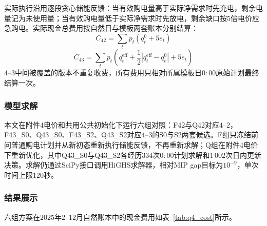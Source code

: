 \documentclass[12pt,a4paper]{ctexart}
\theoremstyle{definition}
\theoremstyle{plain}
\theoremstyle{remark}
\begin{document}
实际执行沿用逐段贪心储能反馈：当有效购电量高于实际净需求时先充电，剩余电量记为未使用量；当有效购电量低于实际净需求时先放电，剩余缺口按$5$倍电价应急购电。实际现金总费用按自然日与模板两套账本分别结算：
\begin{equation}
  C_{42}=\sum_t p_t\left(q_t^{0}+5e_t\right)
  \label{eq:q4_cash42}
\end{equation}
\begin{equation}
  C_{43}=\sum_t p_t\left(q_t^{\mathrm{eff}}+\frac{1}{2}\left|q_t^{\mathrm{eff}}-q_t^{0}\right|+5e_t\right)
  \label{eq:q4_cash43}
\end{equation}
\noindent $4$--$3$中间被覆盖的版本不重复收费，所有费用只相对所属模板日$0{:}00$原始计划最终结算一次。

\subsubsection{模型求解}

本文在附件4电价和共用公共初始化下运行六组对照：F42与Q42对应$4$--$2$，F43\_S0、Q43\_S0、F43\_S2、Q43\_S2对应$4$--$3$的S0与S2两套候选。F组只冻结前问普通购电计划并从新初态重新执行储能反馈，不再重新求解；Q组在附件4电价下重新优化，其中Q43\_S0与Q43\_S2各经历$334$次$0{:}00$计划求解和$1\,002$次日内更新决策。求解仍通过SciPy接口调用HiGHS求解器，相对MIP gap目标为$10^{-9}$，单次时间上限$120$秒。

\subsubsection{结果展示}

六组方案在$2025$年$2$--$12$月自然账本中的现金费用如表~\ref{tab:q4_cost}所示。

\begin{table}[H]
\centering
\caption{问题四六组方案在附件4电价下的全年费用分解}
\label{tab:q4_cost}
\end{table}
\end{document}
